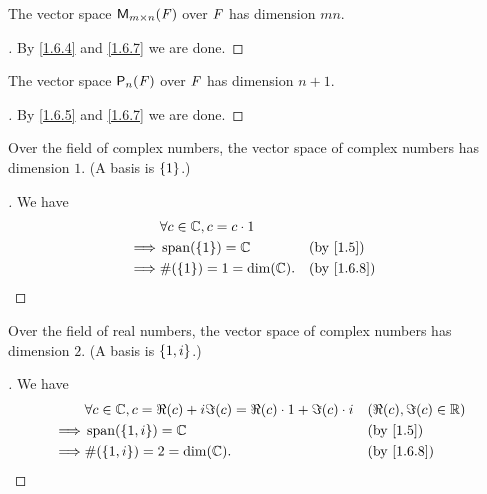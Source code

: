 \begin{eg}\label{1.6.11}
	The vector space \(\ms\) over \(\mathit{F}\) has dimension \(mn\).
\end{eg}

\begin{proof}[]
	By \cref{1.6.4} and \cref{1.6.7} we are done.
\end{proof}

\begin{eg}\label{1.6.12}
	The vector space \(\ps[n]{\F}\) over \(\mathit{F}\) has dimension \(n + 1\).
\end{eg}

\begin{proof}[]
	By \cref{1.6.5} and \cref{1.6.7} we are done.
\end{proof}

\begin{eg}\label{1.6.13}
	Over the field of complex numbers, the vector space of complex numbers has dimension \(1\).
	(A basis is \(\left\lbrace1\right\rbrace\).)
\end{eg}

\begin{proof}[]
	We have
	\begin{align*}
		         & \forall c \in \C, c = c \cdot 1                 \\
		\implies & \spn{\set{1}} = \C              &  & \by{1.5}   \\
		\implies & \#\pa{\set{1}} = 1 = \dim(\C).  &  & \by{1.6.8}
	\end{align*}
\end{proof}

\begin{eg}\label{1.6.14}
	Over the field of real numbers, the vector space of complex numbers has dimension \(2\).
	(A basis is \(\left\lbrace1, i\right\rbrace\).)
\end{eg}

\begin{proof}[]
	We have
	\begin{align*}
		         & \forall c \in \C, c = \Re(c) + i \Im(c) = \Re(c) \cdot 1 + \Im(c) \cdot i &  & (\Re(c), \Im(c) \in \R) \\
		\implies & \spn{\set{1, i}} = \C                                                     &  & \by{1.5}                \\
		\implies & \#\pa{\set{1, i}} = 2 = \dim(\C).                                         &  & \by{1.6.8}
	\end{align*}
\end{proof}


